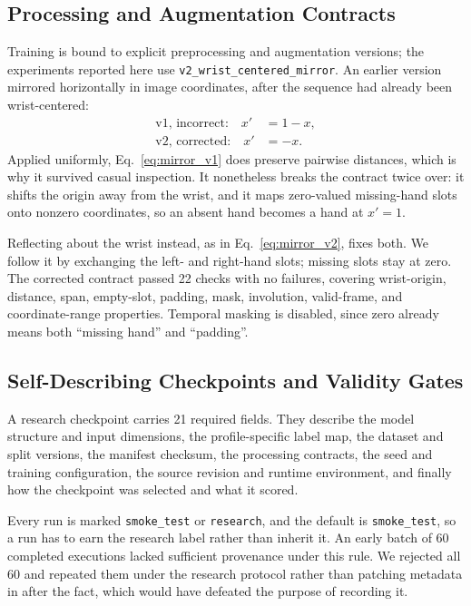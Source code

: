 \subsection{Processing and Augmentation Contracts}

Training is bound to explicit preprocessing and augmentation versions; the experiments reported here use \texttt{v2\_wrist\_centered\_mirror}. An earlier version mirrored horizontally in image coordinates, after the sequence had already been wrist-centered:
\begin{align}
\text{v1, incorrect:}\quad x' &= 1-x, \label{eq:mirror_v1}\\
\text{v2, corrected:}\quad x' &= -x. \label{eq:mirror_v2}
\end{align}
Applied uniformly, Eq.~\eqref{eq:mirror_v1} does preserve pairwise distances, which is why it survived casual inspection. It nonetheless breaks the contract twice over: it shifts the origin away from the wrist, and it maps zero-valued missing-hand slots onto nonzero coordinates, so an absent hand becomes a hand at $x'=1$.

Reflecting about the wrist instead, as in Eq.~\eqref{eq:mirror_v2}, fixes both. We follow it by exchanging the left- and right-hand slots; missing slots stay at zero. The corrected contract passed 22 checks with no failures, covering wrist-origin, distance, span, empty-slot, padding, mask, involution, valid-frame, and coordinate-range properties. Temporal masking is disabled, since zero already means both ``missing hand'' and ``padding''.

\subsection{Self-Describing Checkpoints and Validity Gates}

A research checkpoint carries 21 required fields. They describe the model structure and input dimensions, the profile-specific label map, the dataset and split versions, the manifest checksum, the processing contracts, the seed and training configuration, the source revision and runtime environment, and finally how the checkpoint was selected and what it scored.

Every run is marked \texttt{smoke\_test} or \texttt{research}, and the default is \texttt{smoke\_test}, so a run has to earn the research label rather than inherit it. An early batch of 60 completed executions lacked sufficient provenance under this rule. We rejected all 60 and repeated them under the research protocol rather than patching metadata in after the fact, which would have defeated the purpose of recording it.

